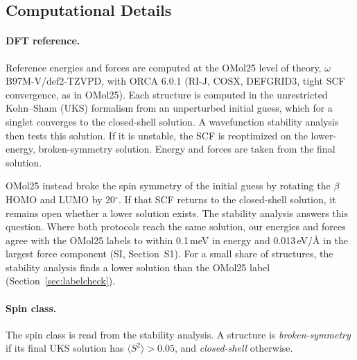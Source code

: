 \subsection{Computational Details}
\label{sec:dft}
\paragraph{DFT reference.}
Reference energies and forces are computed at the OMol25 level of theory, $\omega$B97M-V/def2-TZVPD\cite{mardirossian2016wb97mv,weigend2005def2}, with ORCA 6.0.1\cite{orca6} (RI-J, COSX, DEFGRID3, tight SCF convergence, as in OMol25\cite{omol25}). Each structure is computed in the unrestricted Kohn--Sham (UKS) formalism from an unperturbed initial guess, which for a singlet converges to the closed-shell solution. A wavefunction stability analysis\cite{seeger1977,bauernschmitt1996} then tests this solution. If it is unstable, the SCF is reoptimized on the lower-energy, broken-symmetry solution. Energy and forces are taken from the final solution.

OMol25 instead broke the spin symmetry of the initial guess by rotating the $\beta$ HOMO and LUMO by 20$^\circ$\cite{omol25}. If that SCF returns to the closed-shell solution, it remains open whether a lower solution exists. The stability analysis answers this question. Where both protocols reach the same solution, our energies and forces agree with the OMol25 labels to within 0.1\,meV in energy and 0.013\,eV/\AA{} in the largest force component (SI, Section~S1). For a small share of structures, the stability analysis finds a lower solution than the OMol25 label (Section~\ref{sec:labelcheck}).


\paragraph{Spin class.}
The spin class is read from the stability analysis. A structure is \emph{broken-symmetry} if its final UKS solution has $\langle S^2\rangle > 0.05$, and \emph{closed-shell} otherwise.

